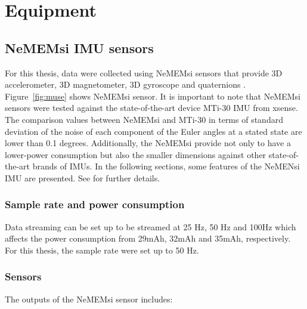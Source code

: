 		\chapter{Equipment} \label{appendix:b}


\graphicspath{{figs/appendixB/PDF/}}


\section{NeMEMsi IMU sensors}  \label{appendix:imus}
For this thesis, data were collected using NeMEMsi sensors 
that provide 3D accelerometer, 3D magnetometer, 
3D gyroscope and quaternions \citep{Comotti2014}.
Figure~\ref{fig:muse} shows NeMEMsi sensor.
It is important to note that NeMEMsi sensors 
were tested against the state-of-the-art device MTi-30 IMU from xsense.
The comparison values between NeMEMsi and MTi-30 in terms of standard deviation 
of the noise of each component of the Euler angles at a stated state are lower 
than 0.1 degrees. 
Additionally, the NeMEMsi provide not only to have a lower-power consumption 
but also the smaller dimensions against other state-of-the-art brands of IMUs.
In the following sections, some features of the NeMENsi IMU are presented.
See \cite{Comotti2014} for further details.


\subsection*{Sample rate and power consumption}
Data streaming can be set up to be streamed at 25 Hz, 50 Hz and 100Hz which
affects the power consumption from 29mAh, 32mAh and 35mAh, respectively.
For this thesis, the sample rate were set up to 50 Hz.

\subsection*{Sensors}
The outputs of the NeMEMsi sensor includes:

